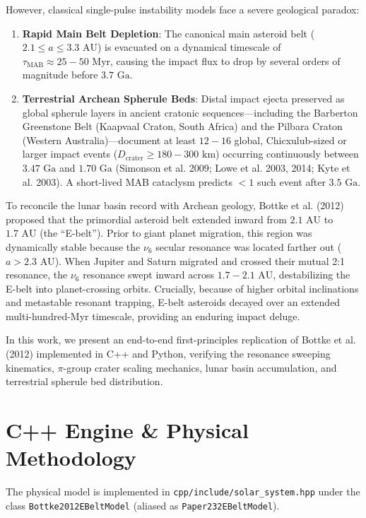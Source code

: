 \documentclass[11pt,a4paper]{article}
\begin{document}
However, classical single-pulse instability models face a severe geological paradox:
\begin{enumerate}
    \item \textbf{Rapid Main Belt Depletion}: The canonical main asteroid belt ($2.1 \le a \le 3.3\text{ AU}$) is evacuated on a dynamical timescale of $\tau_{\text{MAB}} \approx 25-50\text{ Myr}$, causing the impact flux to drop by several orders of magnitude before $3.7\text{ Ga}$.
    \item \textbf{Terrestrial Archean Spherule Beds}: Distal impact ejecta preserved as global spherule layers in ancient cratonic sequences---including the Barberton Greenstone Belt (Kaapvaal Craton, South Africa) and the Pilbara Craton (Western Australia)---document at least $12-16$ global, Chicxulub-sized or larger impact events ($D_{\text{crater}} \ge 180-300\text{ km}$) occurring continuously between $3.47\text{ Ga}$ and $1.70\text{ Ga}$ (Simonson et al. 2009; Lowe et al. 2003, 2014; Kyte et al. 2003). A short-lived MAB cataclysm predicts $<1$ such event after $3.5\text{ Ga}$.
\end{enumerate}

To reconcile the lunar basin record with Archean geology, Bottke et al. (2012) proposed that the primordial asteroid belt extended inward from $2.1\text{ AU}$ to $1.7\text{ AU}$ (the ``E-belt''). Prior to giant planet migration, this region was dynamically stable because the $\nu_6$ secular resonance was located farther out ($a > 2.3\text{ AU}$). When Jupiter and Saturn migrated and crossed their mutual 2:1 resonance, the $\nu_6$ resonance swept inward across $1.7-2.1\text{ AU}$, destabilizing the E-belt into planet-crossing orbits. Crucially, because of higher orbital inclinations and metastable resonant trapping, E-belt asteroids decayed over an extended multi-hundred-Myr timescale, providing an enduring impact deluge.

In this work, we present an end-to-end first-principles replication of Bottke et al. (2012) implemented in C++ and Python, verifying the resonance sweeping kinematics, $\pi$-group crater scaling mechanics, lunar basin accumulation, and terrestrial spherule bed distribution.

\section{C++ Engine \& Physical Methodology}
The physical model is implemented in \texttt{cpp/include/solar\_system.hpp} under the class \linebreak \texttt{Bottke2012EBeltModel} (aliased as \texttt{Paper232EBeltModel}).
\end{document}
